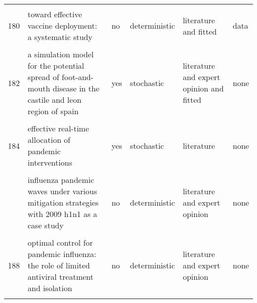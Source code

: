 \documentclass[
]{article}
\begin{document}
\begin{landscape}
\begin{longtable}{l>{\raggedright\arraybackslash}p{3cm}l>{\raggedright\arraybackslash}p{3cm}ll}
\cellcolor{gray!6}{179} & \cellcolor{gray!6}{the global transmission and control of influenza} & \cellcolor{gray!6}{yes} & \cellcolor{gray!6}{stochastic} & \cellcolor{gray!6}{literature} & \cellcolor{gray!6}{data}\\
180 & toward effective vaccine deployment: a systematic study & no & deterministic & literature and fitted & data\\
\addlinespace
\cellcolor{gray!6}{181} & \cellcolor{gray!6}{vaccination against 2009 pandemic h1n1 in a population dynamical model of vancouver, canada: timing is everything} & \cellcolor{gray!6}{no} & \cellcolor{gray!6}{deterministic} & \cellcolor{gray!6}{literature} & \cellcolor{gray!6}{none}\\
182 & a simulation model for the potential spread of foot-and-mouth disease in the castile and leon region of spain & yes & stochastic & literature and expert opinion and fitted & none\\
\cellcolor{gray!6}{183} & \cellcolor{gray!6}{community-based measures for mitigating the 2009 h1n1 pandemic in china} & \cellcolor{gray!6}{no} & \cellcolor{gray!6}{deterministic} & \cellcolor{gray!6}{fitted} & \cellcolor{gray!6}{none}\\
184 & effective real-time allocation of pandemic interventions & yes & stochastic & literature & none\\
\cellcolor{gray!6}{185} & \cellcolor{gray!6}{efficient mitigation strategies for epidemics in rural regions} & \cellcolor{gray!6}{yes} & \cellcolor{gray!6}{deterministic} & \cellcolor{gray!6}{fitted} & \cellcolor{gray!6}{none}\\
\addlinespace
186 & influenza pandemic waves under various mitigation strategies with 2009 h1n1 as a case study & no & deterministic & literature and expert opinion & none\\
\cellcolor{gray!6}{187} & \cellcolor{gray!6}{is a mass immunization program for pandemic (h1n1) 2009 good value for money? early evidence from the canadian experience} & \cellcolor{gray!6}{no} & \cellcolor{gray!6}{deterministic} & \cellcolor{gray!6}{expert opinion} & \cellcolor{gray!6}{none}\\
188 & optimal control for pandemic influenza: the role of limited antiviral treatment and isolation & no & deterministic & literature and expert opinion & none\\
\cellcolor{gray!6}{189} & \cellcolor{gray!6}{optimizing vaccine allocation at different points in time during an epidemic} & \cellcolor{gray!6}{no} & \cellcolor{gray!6}{deterministic} & \cellcolor{gray!6}{literature} & \cellcolor{gray!6}{data}\\

\end{longtable}
\end{landscape}
\end{document}
